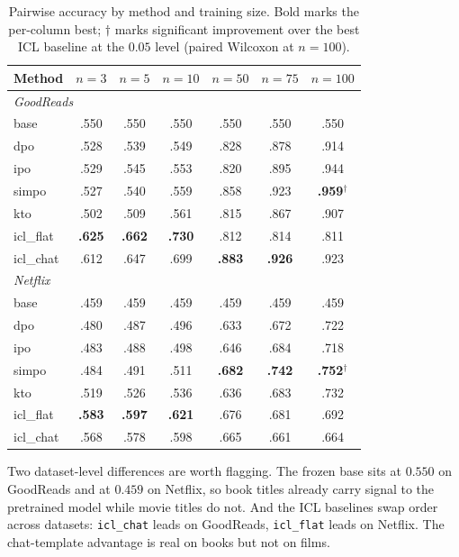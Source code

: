\begin{table}[!ht]
\centering
\caption{Pairwise accuracy by method and training size. Bold marks the per-column best; $\dagger$ marks significant improvement over the best ICL baseline at the $0.05$ level (paired Wilcoxon at $n = 100$).}
\label{tab:primary_acc}
\begin{tabular}{lcccccc}
\toprule
\textbf{Method} & $n = 3$ & $n = 5$ & $n = 10$ & $n = 50$ & $n = 75$ & $n = 100$ \\
\midrule
\multicolumn{7}{l}{\textit{GoodReads}} \\
base                 & .550 & .550 & .550 & .550 & .550 & .550 \\
dpo                  & .528 & .539 & .549 & .828 & .878 & .914 \\
ipo                  & .529 & .545 & .553 & .820 & .895 & .944 \\
simpo                & .527 & .540 & .559 & .858 & .923 & \textbf{.959}$^\dagger$ \\
kto                  & .502 & .509 & .561 & .815 & .867 & .907 \\
icl\_flat            & \textbf{.625} & \textbf{.662} & \textbf{.730} & .812 & .814 & .811 \\
icl\_chat            & .612 & .647 & .699 & \textbf{.883} & \textbf{.926} & .923 \\
\midrule
\multicolumn{7}{l}{\textit{Netflix}} \\
base                 & .459 & .459 & .459 & .459 & .459 & .459 \\
dpo                  & .480 & .487 & .496 & .633 & .672 & .722 \\
ipo                  & .483 & .488 & .498 & .646 & .684 & .718 \\
simpo                & .484 & .491 & .511 & \textbf{.682} & \textbf{.742} & \textbf{.752}$^\dagger$ \\
kto                  & .519 & .526 & .536 & .636 & .683 & .732 \\
icl\_flat            & \textbf{.583} & \textbf{.597} & \textbf{.621} & .676 & .681 & .692 \\
icl\_chat            & .568 & .578 & .598 & .665 & .661 & .664 \\
\bottomrule
\end{tabular}
\end{table}

Two dataset-level differences are worth flagging. The frozen base sits at $0.550$ on GoodReads and at $0.459$ on Netflix, so book titles already carry signal to the pretrained model while movie titles do not. And the ICL baselines swap order across datasets: \texttt{icl\_chat} leads on GoodReads, \texttt{icl\_flat} leads on Netflix. The chat-template advantage is real on books but not on films.

